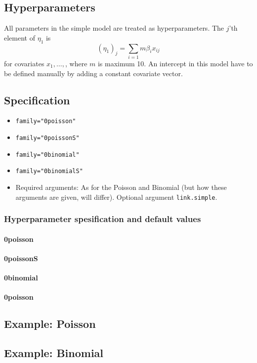 \documentclass[a4paper,11pt]{article}
\begin{document}
\subsection*{Hyperparameters}

All parameters in the simple model are treated as hyperparameters.
The $j$'th element of $\eta_1$ is
\begin{displaymath}
    (\eta_1)_j = \sum_{i=1}{m} \beta_i x_{ij}
\end{displaymath}
for covariates $x_1, \ldots, $, where $m$ is maximum 10. An intercept
in this model have to be defined manually by adding a constant
covariate vector.

\subsection*{Specification}

\begin{itemize}
\item \texttt{family="0poisson"}
\item \texttt{family="0poissonS"}
\item \texttt{family="0binomial"}
\item \texttt{family="0binomialS"}
\item Required arguments: As for the Poisson and Binomial (but how
    these arguments are given, will differ). Optional argument
    \texttt{link.simple}.
\end{itemize}

\subsubsection*{Hyperparameter spesification and default values}
\paragraph{0poisson}
{\small }
\paragraph{0poissonS}
{\small }
\paragraph{0binomial}
{\small }
\paragraph{0poisson}
{\small }


\clearpage
\subsection*{Example: Poisson}
{\small }

\clearpage
\subsection*{Example: Binomial}
{\small }
\end{document}
